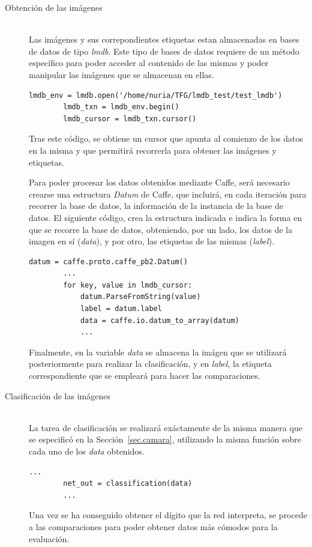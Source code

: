 \begin{description}
	\item[Obtención de las imágenes] \hfill 
	\vspace{10pt}
	\\
	Las imágenes y sus correpondientes etiquetas estan almacenadas en bases de datos de tipo \textit{lmdb}. Este tipo de bases de datos requiere de un método específico para poder acceder al contenido de las mismas y poder manipular las imágenes que se almacenan en ellas.
	\vspace{15pt}
	\begin{lstlisting}[frame=single]
		lmdb_env = lmdb.open('/home/nuria/TFG/lmdb_test/test_lmdb')
		lmdb_txn = lmdb_env.begin()
		lmdb_cursor = lmdb_txn.cursor()
	\end{lstlisting}
	Tras este código, se obtiene un cursor que apunta al comienzo de los datos en la misma y que permitirá recorrerla para obtener las imágenes y etiquetas.\\
	\vspace{-10pt}
	
	Para poder procesar los datos obtenidos mediante Caffe, será necesario crearse una estructura \textit{Datum} de Caffe, que incluirá, en cada iteración para recorrer la base de datos, la información de la instancia de la base de datos. El siguiente código, crea la estructura indicada e indica la forma en que se recorre la base de datos, obteniendo, por un lado, los datos de la imagen en sí (\textit{data}), y por otro, las etiquetas de las mismas (\textit{label}).
	\vspace{10pt}
	\begin{lstlisting}[frame=single]
		datum = caffe.proto.caffe_pb2.Datum()
		...
		for key, value in lmdb_cursor:
			datum.ParseFromString(value)
			label = datum.label
			data = caffe.io.datum_to_array(datum)
			...
	\end{lstlisting}
	Finalmente, en la variable \textit{data} se almacena la imágen que se utilizará posteriormente para realizar la clasificación, y en \textit{label}, la etiqueta correspondiente que se empleará para hacer las comparaciones.
	\vspace{15pt}

	\item[Clasificación de las imágenes] \hfill 
	\vspace{10pt}
	\\
	La tarea de clasificación se realizará exáctamente de la misma manera que se especificó en la Sección~\ref{sec.camara}, utilizando la misma función sobre cada uno de los \textit{data} obtenidos.
	\vspace{10pt}
	\begin{lstlisting}[frame=single]
		...
		net_out = classification(data)
		...
	\end{lstlisting}
	Una vez se ha conseguido obtener el dígito que la red interpreta, se procede a las comparaciones para poder obtener datos más cómodos para la evaluación.
	\vspace{15pt}
	

\end{description}
